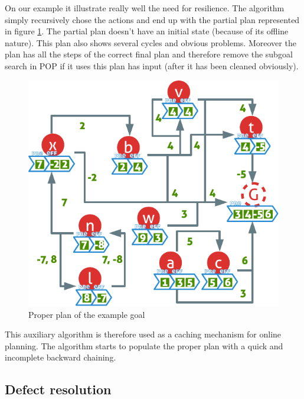 \documentclass[]{article}
\begin{document}
On our example it illustrate really well the need for resilience. The
algorithm simply recursively chose the actions and end up with the
partial plan represented in figure \ref{fig:proper}. The partial plan
doesn't have an initial state (because of its offline nature). This plan
also shows several cycles and obvious problems. Moreover the plan has
all the steps of the correct final plan and therefore remove the subgoal
search in POP if it uses this plan has input (after it has been cleaned
obviously).

\begin{figure}[htbp]
\centering
\includegraphics{graphics/proper.pdf}
\caption{Proper plan of the example goal\label{fig:proper}}
\end{figure}

This auxiliary algorithm is therefore used as a caching mechanism for
online planning. The algorithm starts to populate the proper plan with a
quick and incomplete backward chaining.

\hypertarget{defects}{\subsection{Defect resolution}\label{defects}}
\end{document}
